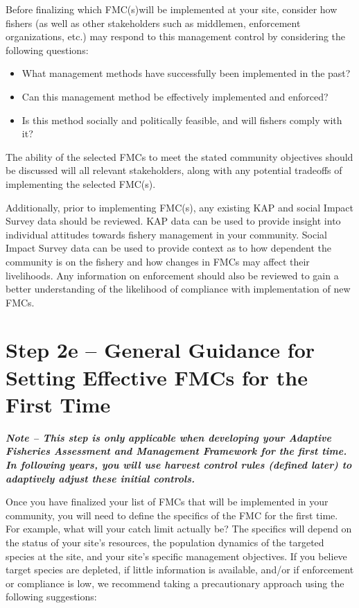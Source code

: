 \documentclass[]{book}
\begin{document}
Before finalizing which FMC(s)will be implemented at your site, consider
how fishers (as well as other stakeholders such as middlemen,
enforcement organizations, etc.) may respond to this management control
by considering the following questions:

\begin{itemize}
\item
  What management methods have successfully been implemented in the
  past?
\item
  Can this management method be effectively implemented and enforced?
\item
  Is this method socially and politically feasible, and will fishers
  comply with it?
\end{itemize}

The ability of the selected FMCs to meet the stated community objectives
should be discussed will all relevant stakeholders, along with any
potential tradeoffs of implementing the selected FMC(s).

Additionally, prior to implementing FMC(s), any existing KAP and social
Impact Survey data should be reviewed. KAP data can be used to provide
insight into individual attitudes towards fishery management in your
community. Social Impact Survey data can be used to provide context as
to how dependent the community is on the fishery and how changes in FMCs
may affect their livelihoods. Any information on enforcement should also
be reviewed to gain a better understanding of the likelihood of
compliance with implementation of new FMCs.

\section{Step 2e -- General Guidance for Setting Effective FMCs for the
First
Time}\label{step-2e-general-guidance-for-setting-effective-fmcs-for-the-first-time}

\textbf{\emph{Note -- This step is only applicable when developing your
Adaptive Fisheries Assessment and Management Framework for the first
time. In following years, you will use harvest control rules (defined
later) to adaptively adjust these initial controls.}}

Once you have finalized your list of FMCs that will be implemented in
your community, you will need to define the specifics of the FMC for the
first time. For example, what will your catch limit actually be? The
specifics will depend on the status of your site's resources, the
population dynamics of the targeted species at the site, and your site's
specific management objectives. If you believe target species are
depleted, if little information is available, and/or if enforcement or
compliance is low, we recommend taking a precautionary approach using
the following suggestions:
\end{document}
